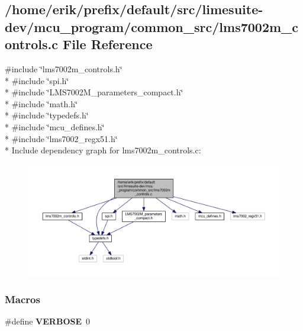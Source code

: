 \subsection{/home/erik/prefix/default/src/limesuite-\/dev/mcu\+\_\+program/common\+\_\+src/lms7002m\+\_\+controls.c File Reference}
\label{lms7002m__controls_8c}
{\ttfamily \#include \char`\"{}lms7002m\+\_\+controls.\+h\char`\"{}}\\*
{\ttfamily \#include \char`\"{}spi.\+h\char`\"{}}\\*
{\ttfamily \#include \char`\"{}L\+M\+S7002\+M\+\_\+parameters\+\_\+compact.\+h\char`\"{}}\\*
{\ttfamily \#include \char`\"{}math.\+h\char`\"{}}\\*
{\ttfamily \#include \char`\"{}typedefs.\+h\char`\"{}}\\*
{\ttfamily \#include \char`\"{}mcu\+\_\+defines.\+h\char`\"{}}\\*
{\ttfamily \#include \char`\"{}lms7002\+\_\+regx51.\+h\char`\"{}}\\*
Include dependency graph for lms7002m\+\_\+controls.\+c\+:
\nopagebreak
\begin{figure}[H]
\begin{center}
\leavevmode
\includegraphics[width=350pt]{dc/d87/lms7002m__controls_8c__incl}
\end{center}
\end{figure}
\subsubsection*{Macros}
\begin{DoxyCompactItemize}
\item 
\#define {\bf V\+E\+R\+B\+O\+SE}~0
\end{DoxyCompactItemize}
